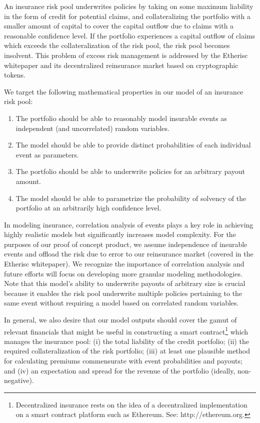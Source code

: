 \documentclass[12pt]{article}
\begin{document}
An insurance risk pool underwrites policies by taking on some maximum liability in the form of credit for potential claims, and collateralizing the portfolio with a smaller amount of capital to cover the capital outflow due to claims with a reasonable confidence level. If the portfolio experiences a capital outflow of claims which exceeds the collateralization of the risk pool, the risk pool becomes insolvent. This problem of excess risk management is addressed by the Etherisc whitepaper and its decentralized reinsurance market based on cryptographic tokens.

We target the following mathematical properties in our model of an insurance risk pool:

\begin{enumerate}
\item The portfolio should be able to reasonably model insurable events as independent (and uncorrelated) random variables.
\item The model should be able to provide distinct probabilities of each individual event as parameters.
\item The portfolio should be able to underwrite policies for an arbitrary payout amount.
\item The model should be able to parametrize the probability of solvency of the portfolio at an arbitrarily high confidence level.  
\end{enumerate}

In modeling insurance, correlation analysis of events plays a key role in achieving highly realistic models but significantly increases model complexity. For the purposes of our proof of concept product, we assume independence of insurable events and offload the risk due to error to our reinsurance market (covered in the Etherisc whitepaper). We recognize the importance of correlation analysis and future efforts will focus on developing more granular modeling methodologies. Note that this model's ability to underwrite payouts of arbitrary size is crucial because it enables the risk pool underwrite multiple policies pertaining to the same event without requiring a model based on correlated random variables.

In general, we also desire that our model outputs should cover the gamut of relevant financials that might be useful in constructing a smart contract\footnote{Decentralized insurance rests on the idea of a decentralized implementation on a smart contract platform such as Ethereum. See: http://ethereum.org.} which manages the insurance pool: (i) the total liability of the credit portfolio; (ii) the required collateralization of the risk portfolio; (iii) at least one plausible method for calculating premiums commensurate with event probabilities and payouts; and (iv) an expectation and spread for the revenue of the portfolio (ideally, non-negative).
\end{document}
